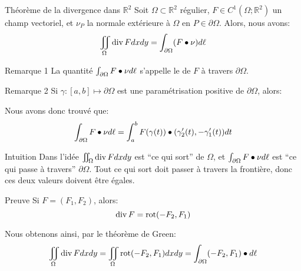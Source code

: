 \documentclass[a4paper]{article}
\begin{document}
\begin{parag}{Théorème de la divergence dans $\mathbb{R}^2$}
    Soit $\Omega \subset \mathbb{R}^2$ régulier, $F \in C^1\left(\Omega;\mathbb{R}^2\right)$ un champ vectoriel, et $\nu_P$ la normale extérieure à $\Omega$ en $P \in \partial \Omega$. Alors, nous avons: 
    \[\iint_{\Omega} \Div F dxdy = \int_{\partial \Omega} \left(F \dotprod \nu\right) d \ell \]
    
    \begin{subparag}{Remarque 1}
        La quantité $\int_{\partial \Omega} F \bullet \nu d \ell $ s'appelle le  de $F$ à travers $\partial \Omega$.
    \end{subparag}

    \begin{subparag}{Remarque 2}
        Si $\gamma: \left[a, b\right] \mapsto \partial\Omega$ est une paramétrisation positive de $\partial\Omega$, alors: 

        
        Nous avons donc trouvé que: 
        \[\int_{\partial \Omega} F \dotprod \nu d \ell = \int_{a}^{b} F\left(\gamma\left(t\right)\right) \dotprod \left(\gamma_2'\left(t\right), -\gamma_1'\left(t\right)\right)dt\]
    \end{subparag}

    \begin{subparag}{Intuition}
        Dans l'idée $\iint_{\Omega} \operatorname{div} F dxdy$ est ``ce qui sort'' de $\Omega$, et $\int_{\partial\Omega} F \bullet \nu d \ell $ est ``ce qui passe à travers'' $\partial \Omega$. Tout ce qui sort doit passer à travers la frontière, donc ces deux valeurs doivent être égales.
    \end{subparag}
    
    \begin{subparag}{Preuve}
        Si $F = \left(F_1, F_2\right)$, alors:
        \[\Div F = \rot\left(-F_2, F_1\right)\]

        Nous obtenons ainsi, par le théorème de Green: 
        \[\iint_{\Omega} \Div F dxdy = \iint_{\Omega} \rot\left(-F_2, F_1\right)dxdy = \int_{\partial \Omega} \left(-F_2, F_1\right) \dotprod d \ell \]
        

\end{subparag}
\end{parag}
\end{document}
